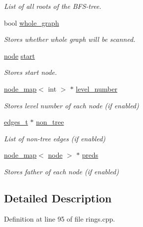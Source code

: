 \begin{DoxyCompactItemize}
\begin{DoxyCompactList}\small\item\em List of all roots of the B\+F\+S-\/tree. \end{DoxyCompactList}\item 
bool \mbox{\hyperlink{classbfs_a6c08fbcc90d71f1cbdd03a1cdaa9dc99}{whole\+\_\+graph}}
\begin{DoxyCompactList}\small\item\em Stores whether whole graph will be scanned. \end{DoxyCompactList}\item 
\mbox{\hyperlink{classnode}{node}} \mbox{\hyperlink{classbfs_af2ab561d9e60a9fc2e25b02d1f807f96}{start}}
\begin{DoxyCompactList}\small\item\em Stores start node. \end{DoxyCompactList}\item 
\mbox{\hyperlink{classnode__map}{node\+\_\+map}}$<$ int $>$ $\ast$ \mbox{\hyperlink{classbfs_aab92e9d128612c28324aafe4750dbc84}{level\+\_\+number}}
\begin{DoxyCompactList}\small\item\em Stores level number of each node (if enabled) \end{DoxyCompactList}\item 
\mbox{\hyperlink{edge_8h_a8f9587479bda6cf612c103494b3858e3}{edges\+\_\+t}} $\ast$ \mbox{\hyperlink{classbfs_a056b2131db11e62eb8f41c8dcc117d2e}{non\+\_\+tree}}
\begin{DoxyCompactList}\small\item\em List of non-\/tree edges (if enabled) \end{DoxyCompactList}\item 
\mbox{\hyperlink{classnode__map}{node\+\_\+map}}$<$ \mbox{\hyperlink{classnode}{node}} $>$ $\ast$ \mbox{\hyperlink{classbfs_a3bac5ed333bb78a30a67099c3b94aa0c}{preds}}
\begin{DoxyCompactList}\small\item\em Stores father of each node (if enabled) \end{DoxyCompactList}\end{DoxyCompactItemize}


\subsection{Detailed Description}


Definition at line 95 of file rings.\+cpp.



